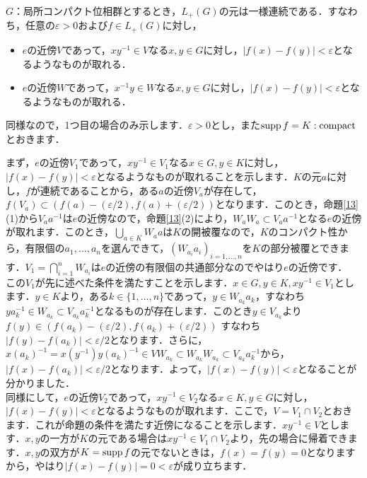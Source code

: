 \begin{yprop}\label{16}
$G$：局所コンパクト位相群とするとき，$L_{+}(G)$の元は一様連続である．すなわち，任意の$\varepsilon>0$および$f \in L_{+}(G)$に対し，
\begin{itemize}
 \item $e$の近傍$V$であって，$xy^{-1} \in V$なる$x, y \in G$に対し，$|f(x)-f(y)|<\varepsilon$となるようなものが取れる．
 \item $e$の近傍$W$であって，$x^{-1}y \in W$なる$x, y \in G$に対し，$|f(x)-f(y)|<\varepsilon$となるようなものが取れる．
\end{itemize}
\end{yprop}
\begin{Proof}
同様なので，1つ目の場合のみ示します．$\varepsilon>0$とし，また$\operatorname{supp} f=K : \mathrm{compact}$とおきます．

まず，$e$の近傍$V_1$であって，$xy^{-1} \in V_1$なる$x \in G, y \in K$に対し，$|f(x)-f(y)|<\varepsilon$となるようなものが取れることを示します．$K$の元$a$に対し，$f$が連続であることから，ある$a$の近傍$V_a$が存在して，$f(V_a) \subset (f(a)-(\varepsilon /2), f(a)+(\varepsilon /2) )$となります．このとき，命題\ref{13}(1)から$V_{a}a^{-1}$は$e$の近傍なので，命題\ref{13}(2)により，$W_{a}W_{a} \subset V_{a}a^{-1}$となる$e$の近傍が取れます．このとき，$\bigcup_{a \in K}{W_a}a$は$K$の開被覆なので，$K$のコンパクト性から，有限個の$a_1, \ldots, a_n$を選んできて，$( W_{a_i}a_{i} )_{i=1,\ldots,n}$を$K$の部分被覆とできます．$V_1=\bigcap_{i=1}^{n}W_{a_i}$は$e$の近傍の有限個の共通部分なのでやはり$e$の近傍です．\\

この$V_1$が先に述べた条件を満たすことを示します．$x \in G, y \in K, xy^{-1} \in V_1$とします．$y \in K$より，ある$k \in \{1, \ldots , n \}$であって，$y \in W_{a_k}a_{k}$，すなわち$ya_{k}^{-1} \in W_{a_k} \subset V_{a_k}a_{k}^{-1}$となるものが存在します．このとき$y \in V_{a_k}$より$f(y) \in (f(a_k)-(\varepsilon/2), f(a_k)+(\varepsilon /2) )$ すなわち $|f(y)-f(a_k)|<\varepsilon /2$となります．さらに，$x(a_k)^{-1}=x(y^{-1})y(a_k)^{-1} \in VW_{a_k} \subset W_{a_k}W_{a_k} \subset V_{a_k}a_{k}^{-1}$から，$|f(x)-f(a_k)|<\varepsilon /2$となります．よって，$|f(x)-f(y)|<\varepsilon$となることが分かりました．\\

同様にして，$e$の近傍$V_2$であって，$xy^{-1} \in V_2$なる$x \in K, y \in G$に対し，$|f(x)-f(y)|<\varepsilon$となるようなものが取れます．ここで，$V=V_1 \cap V_2$とおきます．これが命題の条件を満たす近傍になることを示します．$xy^{-1} \in V$とします．$x,y$の一方が$K$の元である場合は$xy^{-1} \in V_1 \cap V_2$より，先の場合に帰着できます．$x,y$の双方が$K=\operatorname{supp} f$の元でないときは，$f(x)=f(y)=0$となりますから，やはり$|f(x)-f(y)|=0<\varepsilon$が成り立ちます．　
\end{Proof}

